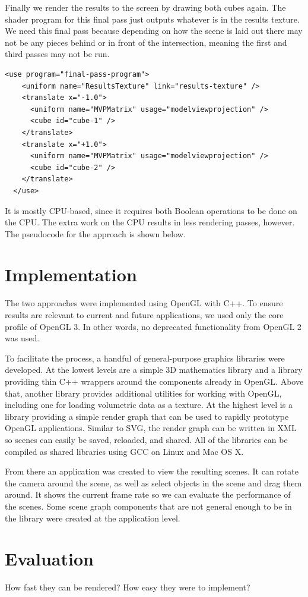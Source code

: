 \documentclass{article}
\begin{document}
Finally we render the results to the screen by drawing both cubes again.  The
shader program for this final pass just outputs whatever is in the results
texture.  We need this final pass because depending on how the scene is laid out
there may not be any pieces behind or in front of the intersection, meaning the
first and third passes may not be run.

\begin{Verbatim}[fontsize=\small]
  <use program="final-pass-program">
    <uniform name="ResultsTexture" link="results-texture" />
    <translate x="-1.0">
      <uniform name="MVPMatrix" usage="modelviewprojection" />
      <cube id="cube-1" />
    </translate>
    <translate x="+1.0">
      <uniform name="MVPMatrix" usage="modelviewprojection" />
      <cube id="cube-2" />
    </translate>
  </use>
\end{Verbatim}

It is mostly CPU-based, since it requires both Boolean operations to be done on
the CPU.  The extra work on the CPU results in less rendering passes, however.
The pseudocode for the approach is shown below.

\section{Implementation}

The two approaches were implemented using OpenGL with C++.  To ensure results
are relevant to current and future applications, we used only the core profile
of OpenGL 3.  In other words, no deprecated functionality from OpenGL 2 was
used.

To facilitate the process, a handful of general-purpose graphics libraries were
developed.  At the lowest levels are a simple 3D mathematics library and a
library providing thin C++ wrappers around the components already in OpenGL.
Above that, another library provides additional utilities for working with
OpenGL, including one for loading volumetric data as a texture.  At the highest
level is a library providing a simple render graph that can be used to rapidly
prototype OpenGL applications.  Similar to SVG, the render graph can be written
in XML so scenes can easily be saved, reloaded, and shared.  All of the
libraries can be compiled as shared libraries using GCC on Linux and Mac OS X.

From there an application was created to view the resulting scenes.  It can
rotate the camera around the scene, as well as select objects in the scene and
drag them around.  It shows the current frame rate so we can evaluate the
performance of the scenes.  Some scene graph components that are not general
enough to be in the library were created at the application level.

\section{Evaluation}

How fast they can be rendered?
How easy they were to implement?




\end{document}
